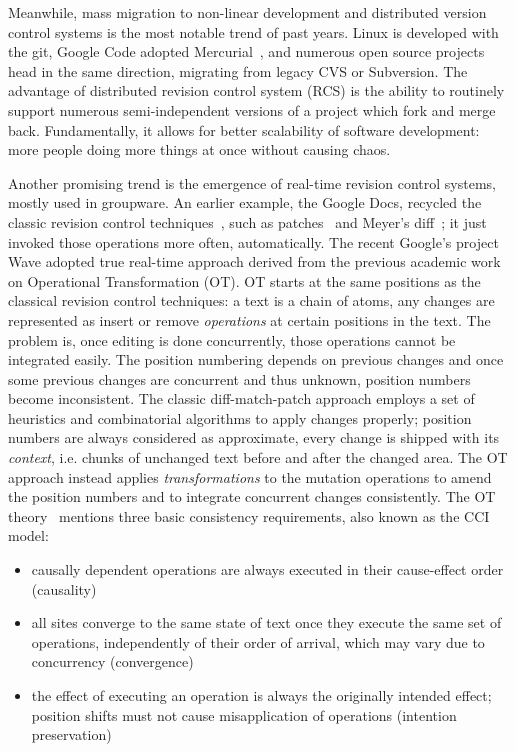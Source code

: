 \documentclass{acm_proc_article-sp}
\begin{document}
Meanwhile, mass migration to non-linear development and distributed
version control systems is the most notable trend of past
years. Linux is developed with the git, Google Code adopted
Mercurial~\cite{mercurial}, and numerous open source projects head in the
same direction, migrating from legacy CVS or Subversion.
The advantage of distributed revision control system (RCS) is the ability
to routinely support numerous semi-independent versions
of a project which fork and merge back.
Fundamentally, it allows for better scalability of
software development: more people doing more things at
once without causing chaos.

Another promising trend is the emergence of real-time
revision control systems, mostly used in groupware.
An earlier example, the Google Docs, recycled the classic revision
control techniques~\cite{diff-match-patch}, such as
patches~\cite{patch} and Meyer's diff~\cite{meyers-diff};
it just invoked those operations more often, automatically.
The recent Google's project Wave adopted true
real-time approach derived from the previous academic
work on Operational Transformation (OT).
OT starts at the same positions as the classical revision
control techniques: a text is a chain of atoms,
any changes are represented as insert or remove
\emph{operations} at certain positions in the
text. The problem is, once editing is done concurrently,
those operations cannot be integrated easily. The position
numbering depends on previous changes and once some previous
changes are concurrent and thus unknown, position numbers
become inconsistent. The classic diff-match-patch approach
employs a set of heuristics and combinatorial algorithms
to apply changes properly; position numbers are always
considered as approximate, every change is shipped with
its \emph{context}, i.e. chunks of unchanged text before
and after the changed area.
The OT approach instead applies
\emph{transformations} to the mutation operations to amend
the position numbers and to integrate concurrent
changes consistently. The OT theory~\cite{sun-achieving} mentions
three basic consistency requirements, also known as the CCI
model: 
\begin{itemize}
\item causally dependent operations are always
executed in their cause-effect order (causality)
\item all sites converge to the same state of text once
they execute the same set of operations, independently of
their order of arrival, which may vary due to concurrency (convergence)
\item the effect of executing an operation is
always the originally intended effect; position shifts must
not cause misapplication of operations (intention preservation)
\end{itemize}
\end{document}
